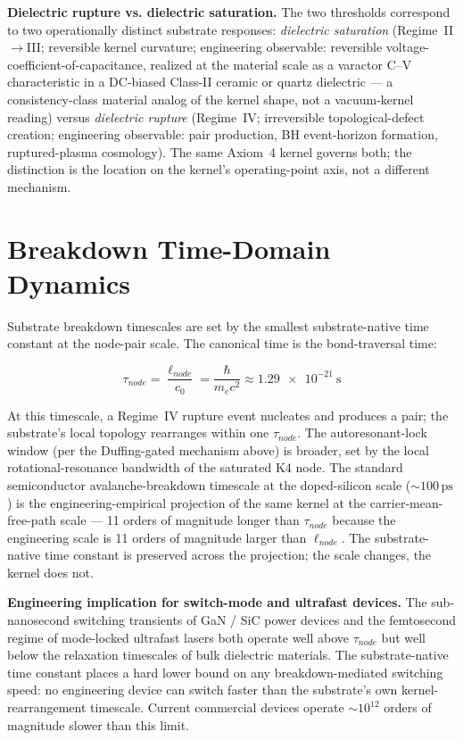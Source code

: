 \textbf{Dielectric rupture vs. dielectric saturation.} The two thresholds correspond to two operationally distinct substrate responses: \emph{dielectric saturation} (Regime~II$\to$III; reversible kernel curvature; engineering observable: reversible voltage-coefficient-of-capacitance, realized at the material scale as a varactor C--V characteristic in a DC-biased Class-II ceramic or quartz dielectric --- a consistency-class material analog of the kernel shape, not a vacuum-kernel reading) versus \emph{dielectric rupture} (Regime~IV; irreversible topological-defect creation; engineering observable: pair production, BH event-horizon formation, ruptured-plasma cosmology). The same Axiom~4 kernel governs both; the distinction is the location on the kernel's operating-point axis, not a different mechanism.

\section{Breakdown Time-Domain Dynamics}
\label{sec:vol9_breakdown_timescales}

Substrate breakdown timescales are set by the smallest substrate-native time constant at the node-pair scale. The canonical time is the bond-traversal time:

\begin{equation}
    \tau_{node} = \frac{\ell_{node}}{c_0} = \frac{\hbar}{m_e c^2} \approx \qty{1.29e-21}{\second}
    \label{eq:vol9_tau_node}
\end{equation}

At this timescale, a Regime~IV rupture event nucleates and produces a pair; the substrate's local topology rearranges within one $\tau_{node}$. The autoresonant-lock window (per the Duffing-gated mechanism above) is broader, set by the local rotational-resonance bandwidth of the saturated K4 node. The standard semiconductor avalanche-breakdown timescale at the doped-silicon scale ($\sim 100\,\text{ps}$) is the engineering-empirical projection of the same kernel at the carrier-mean-free-path scale --- 11 orders of magnitude longer than $\tau_{node}$ because the engineering scale is 11 orders of magnitude larger than $\ell_{node}$. The substrate-native time constant is preserved across the projection; the scale changes, the kernel does not.

\textbf{Engineering implication for switch-mode and ultrafast devices.} The sub-nanosecond switching transients of GaN / SiC power devices and the femtosecond regime of mode-locked ultrafast lasers both operate well above $\tau_{node}$ but well below the relaxation timescales of bulk dielectric materials. The substrate-native time constant places a hard lower bound on any breakdown-mediated switching speed: no engineering device can switch faster than the substrate's own kernel-rearrangement timescale. Current commercial devices operate $\sim 10^{12}$ orders of magnitude slower than this limit.

